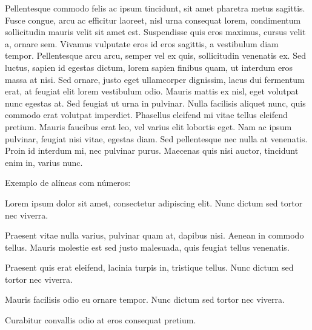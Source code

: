 Pellentesque commodo felis ac ipsum tincidunt, sit amet pharetra metus sagittis. Fusce congue, arcu ac efficitur laoreet, nisl urna consequat lorem, condimentum sollicitudin mauris velit sit amet est. Suspendisse quis eros maximus, cursus velit a, ornare sem. Vivamus vulputate eros id eros sagittis, a vestibulum diam tempor. Pellentesque arcu arcu, semper vel ex quis, sollicitudin venenatis ex. Sed luctus, sapien id egestas dictum, lorem sapien finibus quam, ut interdum eros massa at nisi. Sed ornare, justo eget ullamcorper dignissim, lacus dui fermentum erat, at feugiat elit lorem vestibulum odio. Mauris mattis ex nisl, eget volutpat nunc egestas at. Sed feugiat ut urna in pulvinar. Nulla facilisis aliquet nunc, quis commodo erat volutpat imperdiet. Phasellus eleifend mi vitae tellus eleifend pretium. Mauris faucibus erat leo, vel varius elit lobortis eget. Nam ac ipsum pulvinar, feugiat nisi vitae, egestas diam. Sed pellentesque nec nulla at venenatis. Proin id interdum mi, nec pulvinar purus. Maecenas quis nisi auctor, tincidunt enim in, varius nunc.


Exemplo de alíneas com números:

\begin{alineascomnumero}
	\item Lorem ipsum dolor sit amet, consectetur adipiscing elit. Nunc dictum sed tortor nec viverra.
	\item Praesent vitae nulla varius, pulvinar quam at, dapibus nisi. Aenean in commodo tellus. Mauris molestie est sed justo malesuada, quis feugiat tellus venenatis.
	\item Praesent quis erat eleifend, lacinia turpis in, tristique tellus. Nunc dictum sed tortor nec viverra.
	\item Mauris facilisis odio eu ornare tempor. Nunc dictum sed tortor nec viverra.
	\item Curabitur convallis odio at eros consequat pretium.
\end{alineascomnumero}

